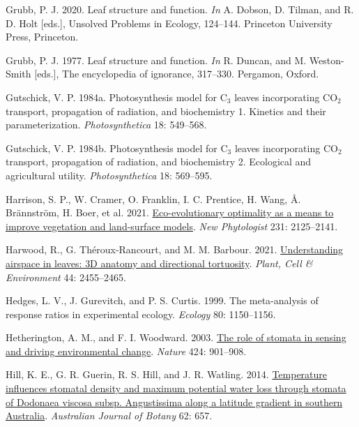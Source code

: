 \documentclass[
  letterpaper,
  DIV=11,
  numbers=noendperiod]{scrartcl}
\newlength{\cslhangindent}
\newlength{\cslentryspacingunit} %
\newenvironment{CSLReferences}[2] %
 {%
  \setlength{\parindent}{0pt}
  \ifodd #1
  \let\oldpar\par
  \def\par{\hangindent=\cslhangindent\oldpar}
  \fi
  \setlength{\parskip}{#2\cslentryspacingunit}
 }%
 {}
\begin{document}
\begin{CSLReferences}{1}{0}
\leavevmode{}%
Grubb, P. J. 2020. Leaf structure and function. \emph{In} A. Dobson, D.
Tilman, and R. D. Holt {[}eds.{]}, Unsolved {Problems} in {Ecology},
124--144. Princeton University Press, Princeton.

\leavevmode{}%
Grubb, P. J. 1977. Leaf structure and function. \emph{In} R. Duncan, and
M. Weston-Smith {[}eds.{]}, The encyclopedia of ignorance, 317--330.
Pergamon, Oxford.

\leavevmode{}%
Gutschick, V. P. 1984a. Photosynthesis model for {C}\(_{\textrm{3}}\)
leaves incorporating {CO}\(_{\textrm{2}}\) transport, propagation of
radiation, and biochemistry 1. Kinetics and their parameterization.
\emph{Photosynthetica} 18: 549--568.

\leavevmode{}%
Gutschick, V. P. 1984b. Photosynthesis model for {C}\(_{\textrm{3}}\)
leaves incorporating {CO}\(_{\textrm{2}}\) transport, propagation of
radiation, and biochemistry 2. Ecological and agricultural utility.
\emph{Photosynthetica} 18: 569--595.

\leavevmode{}%
Harrison, S. P., W. Cramer, O. Franklin, I. C. Prentice, H. Wang, Å.
Brännström, H. Boer, et al. 2021.
\href{https://doi.org/10.1111/nph.17558}{Eco-evolutionary optimality as
a means to improve vegetation and land-surface models}. \emph{New
Phytologist} 231: 2125--2141.

\leavevmode{}%
Harwood, R., G. Théroux-Rancourt, and M. M. Barbour. 2021.
\href{https://doi.org/10.1111/pce.14079}{Understanding airspace in
leaves: {3D} anatomy and directional tortuosity}. \emph{Plant, Cell \&
Environment} 44: 2455--2465.

\leavevmode{}%
Hedges, L. V., J. Gurevitch, and P. S. Curtis. 1999. The meta-analysis
of response ratios in experimental ecology. \emph{Ecology} 80:
1150--1156.

\leavevmode{}%
Hetherington, A. M., and F. I. Woodward. 2003.
\href{https://doi.org/10.1038/nature01843}{The role of stomata in
sensing and driving environmental change}. \emph{Nature} 424: 901--908.

\leavevmode{}%
Hill, K. E., G. R. Guerin, R. S. Hill, and J. R. Watling. 2014.
\href{https://doi.org/10.1071/BT14204}{Temperature influences stomatal
density and maximum potential water loss through stomata of {Dodonaea}
viscosa subsp. Angustissima along a latitude gradient in southern
{Australia}}. \emph{Australian Journal of Botany} 62: 657.


\end{CSLReferences}
\end{document}
